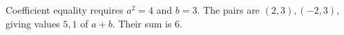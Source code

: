 Coefficient equality requires $a^2=4$ and $b=3$. The pairs are $(2,3),(-2,3)$, giving values $5,1$ of $a+b$. Their sum is $\boxed6$.
